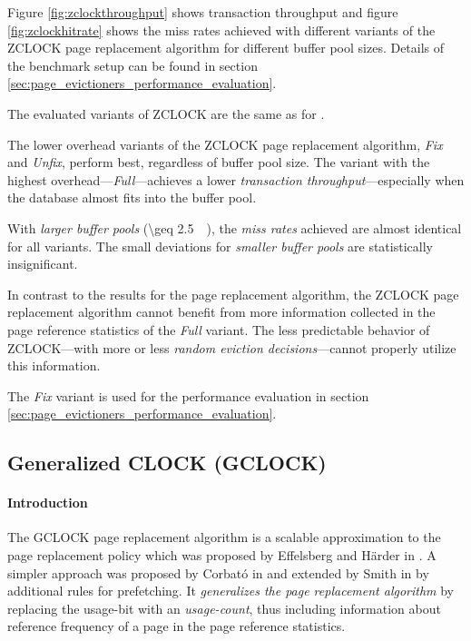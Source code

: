     Figure \ref{fig:zclockthroughput} shows transaction throughput and figure \ref{fig:zclockhitrate} shows the miss rates achieved with different variants of the ZCLOCK page replacement algorithm for different buffer pool sizes. Details of the benchmark setup can be found in section \ref{sec:page_evictioners_performance_evaluation}.

    The evaluated variants of ZCLOCK are the same as for .

    The lower overhead variants of the ZCLOCK page replacement algorithm, \emph{Fix} and \emph{Unfix}, perform best, regardless of buffer pool size. The variant with the highest overhead---\emph{Full}---achieves a lower \emph{transaction throughput}---especially when the database almost fits into the buffer pool.

    With \emph{larger buffer pools} (\SI{\geq 2.5}{\giga\byte}), the \emph{miss rates} achieved are almost identical for all variants. The small deviations for \emph{smaller buffer pools} are statistically insignificant.

    In contrast to the results for the  page replacement algorithm, the ZCLOCK page replacement algorithm cannot benefit from more information collected in the page reference statistics of the \emph{Full} variant. The less predictable behavior of ZCLOCK---with more or less \emph{random eviction decisions}---cannot properly utilize this information.

    The \emph{Fix} variant is used for the performance evaluation in section \ref{sec:page_evictioners_performance_evaluation}.

\subsection[GCLOCK]{Generalized CLOCK (GCLOCK)} \label{subsec:gclock}

\paragraph{Introduction}

    The GCLOCK page replacement algorithm is a scalable approximation to the  page replacement policy which was proposed by Effelsberg and Härder in \cite{Effelsberg:1984}. A simpler approach was proposed by Corbató in \cite{Corbato:1969} and extended by Smith in \cite{Smith:1978} by additional rules for prefetching. It \emph{generalizes the  page replacement algorithm} by replacing the usage-bit with an \emph{usage-count}, thus including information about reference frequency of a page in the page reference statistics.

